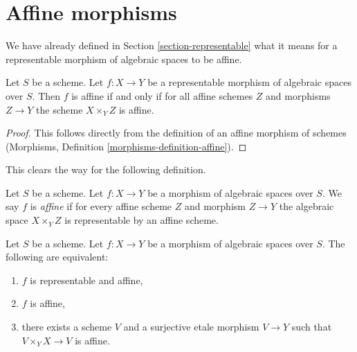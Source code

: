 \section{Affine morphisms}
\label{section-affine}

\noindent
We have already defined in Section \ref{section-representable}
what it means for a representable morphism of algebraic spaces
to be affine.

\begin{lemma}
\label{lemma-affine-representable}
Let $S$ be a scheme. Let $f : X \to Y$ be a representable
morphism of algebraic spaces over $S$. Then
$f$ is affine if and only if for all affine schemes $Z$
and morphisms $Z \to Y$ the scheme $X \times_Y Z$ is affine.
\end{lemma}

\begin{proof}
This follows directly from the definition of an affine morphism of schemes
(Morphisms, Definition \ref{morphisms-definition-affine}).
\end{proof}

\noindent
This clears the way for the following definition.

\begin{definition}
\label{definition-affine}
Let $S$ be a scheme.
Let $f : X \to Y$ be a morphism of algebraic spaces over $S$.
We say $f$ is {\it affine} if for every affine scheme $Z$ and
morphism $Z \to Y$ the algebraic space $X \times_Y Z$ is representable
by an affine scheme.
\end{definition}

\begin{lemma}
\label{lemma-affine-local}
Let $S$ be a scheme.
Let $f : X \to Y$ be a morphism of algebraic spaces over $S$.
The following are equivalent:
\begin{enumerate}
\item $f$ is representable and affine,
\item $f$ is affine,
\item there exists a scheme $V$ and a surjective etale morphism
$V \to Y$ such that $V \times_Y X \to V$ is affine.
\end{enumerate}
\end{lemma}


